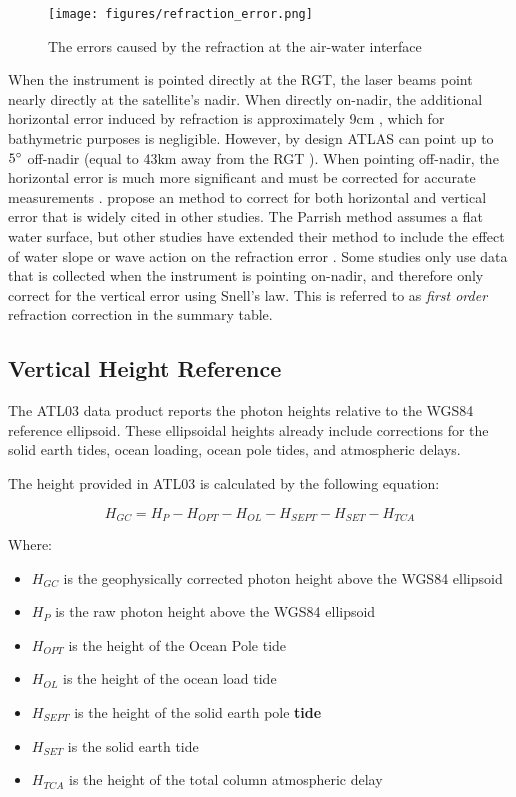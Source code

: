 \begin{figure}[ht]
      \centering
      \texttt{[image: figures/refraction\_error.png]}
      \caption{The errors caused by the refraction at the air-water interface}
      \label{refract-image}
\end{figure}

When the instrument is pointed directly at the RGT, the laser beams point nearly directly at the satellite's nadir. When directly on-nadir, the additional horizontal error induced by refraction is approximately 9cm \parencite{Parrish2019}, which for bathymetric purposes is negligible. However, by design ATLAS can point up to $5 \degree$ off-nadir (equal to 43km away from the RGT \parencite{Magruder2021}). When pointing off-nadir, the horizontal error is much more significant and must be corrected for accurate measurements \parencite{Parrish2019}.\citeauthor{Parrish2019} propose an method to correct for both horizontal and vertical error that is widely cited in other studies. The Parrish method assumes a flat water surface, but other studies have extended their method to include the effect of water slope or wave action on the refraction error \parencite{Ma2020,Zhang2022}. Some studies only use data that is collected when the instrument is pointing on-nadir, and therefore only correct for the vertical error using Snell's law. This is referred to as \emph{first order} refraction correction in the summary table.

\subsection{Vertical Height Reference}

The ATL03 data product reports the photon heights relative to the WGS84 reference ellipsoid. These ellipsoidal heights already include corrections for the solid earth tides, ocean loading, ocean pole tides, and atmospheric delays.

The height provided in ATL03 is calculated by the following equation:

\[H_{GC} =  H_{P} - H_{OPT} - H_{OL} - H_{SEPT} - H_{SET} - H_{TCA}\]

Where:

\begin{itemize}

      \item \(H_{GC}\) is the geophysically corrected photon height above the WGS84 ellipsoid
      \item \(H_{P}\) is the raw photon height above the WGS84 ellipsoid
      \item \(H_{OPT}\) is the height of the Ocean Pole tide
      \item \(H_{OL}\) is the height of the ocean load tide
      \item \(H_{SEPT}\) is the height of the solid earth pole \textbf{tide}
      \item \(H_{SET}\) is the solid earth tide
      \item \(H_{TCA}\) is the height of the total column atmospheric delay
\end{itemize}

